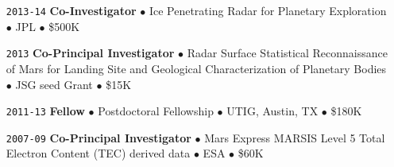 \begin{itemize}[leftmargin=5.8em, labelsep=1.5em]
    \item[\texttt{2013-14}] \textbf{Co-Investigator} $\bullet$ Ice Penetrating Radar for Planetary Exploration $\bullet$ JPL $\bullet$ \$500K
    
    \item[\texttt{2013}] \textbf{Co-Principal Investigator} $\bullet$ Radar Surface Statistical Reconnaissance of Mars for Landing Site and Geological Characterization of Planetary Bodies $\bullet$ JSG seed Grant $\bullet$ \$15K
    
    \item[\texttt{2011-13}] \textbf{Fellow} $\bullet$ Postdoctoral Fellowship $\bullet$ UTIG, Austin, TX $\bullet$ \$180K
    
    \item[\texttt{2007-09}] \textbf{Co-Principal Investigator} $\bullet$ Mars Express MARSIS Level 5 Total Electron Content (TEC) derived data $\bullet$ ESA $\bullet$ \$60K
\end{itemize}